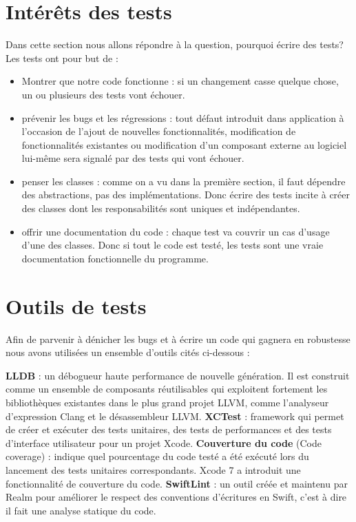 \section{Intérêts des tests} %
\label{sub:pourquoi_tester_}
Dans cette section nous allons répondre à la question, pourquoi écrire des tests?\newline
Les tests ont pour but de :
\begin{itemize}
	\item Montrer que notre code fonctionne :  si un changement casse quelque chose, un ou plusieurs des tests vont échouer.
	\item prévenir les bugs et les régressions : tout défaut introduit dans application à l'occasion de l'ajout de nouvelles fonctionnalités, modification de fonctionnalités existantes ou modification d'un composant externe au logiciel lui-même sera signalé par des tests qui vont échouer.
	\item penser les classes : comme on a vu dans la première section, il faut dépendre des abstractions, pas des implémentations. Donc écrire des tests incite à créer des classes dont les responsabilités sont uniques et indépendantes.
	\item offrir une documentation du code : chaque test va couvrir un cas d'usage d'une des classes. Donc si tout le code est testé, les tests sont une vraie documentation fonctionnelle du programme.
\end{itemize} 

\section{Outils de tests} %
\label{sub:outils_de_tests}
Afin de parvenir à dénicher les bugs et à écrire un code qui gagnera en robustesse nous avons utilisées un ensemble d'outils cités ci-dessous : 
\begin{itemize}
	\itemb \textbf{LLDB} : un débogueur haute performance de nouvelle génération. Il est construit comme un ensemble de composants réutilisables qui exploitent fortement les bibliothèques existantes dans le plus grand projet LLVM, comme l'analyseur d'expression Clang et le désassembleur LLVM.
	\itemb \textbf{XCTest} : framework qui permet de créer et exécuter des tests unitaires, des tests de performances et des tests d'interface utilisateur pour un projet Xcode.
	\itemb \textbf{Couverture du code} (Code coverage) : indique quel pourcentage du code testé a été exécuté lors du lancement des tests unitaires correspondants. Xcode 7 a introduit une fonctionnalité de couverture du code.
	\itemb \textbf{SwiftLint} : un outil créée et maintenu par Realm pour améliorer le respect des conventions d’écritures en Swift, c'est à dire il fait une analyse statique du code.
\end{itemize}

